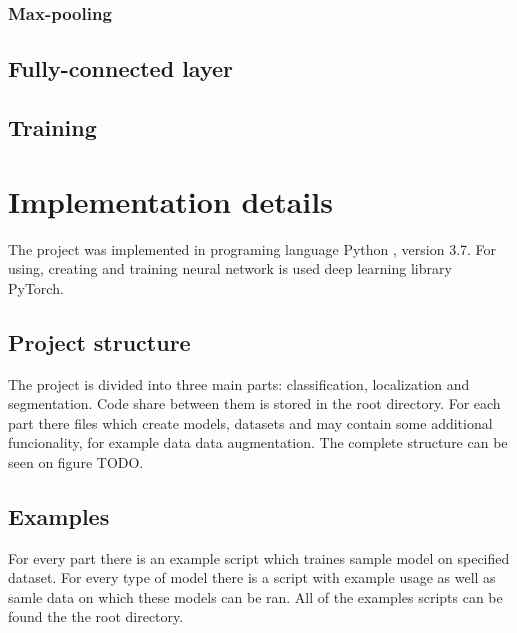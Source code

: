 \documentclass[twoside]{ctuthesis}
\theoremstyle{plain}
\theoremstyle{definition}
\theoremstyle{note}
\begin{document}
\subsection{Max-pooling}


\section{Fully-connected layer}


\section{Training}



\chapter{Implementation details}
The project was implemented in programing language Python \cite{Python}, version 3.7.
For using, creating and training neural network is used deep learning library PyTorch\cite{PyTorch}.



\section{Project structure}
The project is divided into three main parts: classification, localization and segmentation.
Code share between them is stored in the root directory. For each part there files which create
models, datasets and may contain some additional funcionality, for example data data augmentation.
The complete structure can be seen on figure TODO.

\section{Examples}
For every part there is an example script which traines sample model on specified dataset. For
every type of model there is a script with example usage as well as samle data on which these 
models can be ran. All of the examples scripts can be found the the root directory.

\printindex

\appendix




\end{document}
